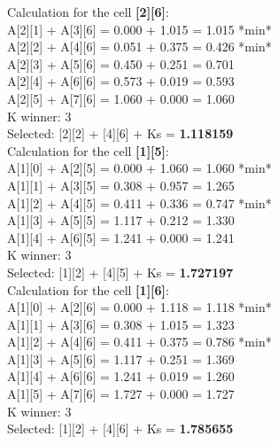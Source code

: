 \documentclass[a4paper,twocolumn,10pt]{article}
\newcommand\tab[1][1cm]{\hspace*{#1}}
\newcommand\minitab[1][0.5cm]{\hspace*{#1}}
\begin{document}
Calculation for the cell \textbf{[2][6]}: \\ 
\tab A[2][1] + A[3][6] = 0.000 + 1.015 = 1.015 *min*\\ 
\tab A[2][2] + A[4][6] = 0.051 + 0.375 = 0.426 *min*\\ 
\tab A[2][3] + A[5][6] = 0.450 + 0.251 = 0.701\\ 
\tab A[2][4] + A[6][6] = 0.573 + 0.019 = 0.593\\ 
\tab A[2][5] + A[7][6] = 1.060 + 0.000 = 1.060\\ 
\minitab K winner: 3 \\ 
\minitab Selected: [2][2] + [4][6] + Ks = \textbf{1.118159} \\ 
 
Calculation for the cell \textbf{[1][5]}: \\ 
\tab A[1][0] + A[2][5] = 0.000 + 1.060 = 1.060 *min*\\ 
\tab A[1][1] + A[3][5] = 0.308 + 0.957 = 1.265\\ 
\tab A[1][2] + A[4][5] = 0.411 + 0.336 = 0.747 *min*\\ 
\tab A[1][3] + A[5][5] = 1.117 + 0.212 = 1.330\\ 
\tab A[1][4] + A[6][5] = 1.241 + 0.000 = 1.241\\ 
\minitab K winner: 3 \\ 
\minitab Selected: [1][2] + [4][5] + Ks = \textbf{1.727197} \\ 
 
Calculation for the cell \textbf{[1][6]}: \\ 
\tab A[1][0] + A[2][6] = 0.000 + 1.118 = 1.118 *min*\\ 
\tab A[1][1] + A[3][6] = 0.308 + 1.015 = 1.323\\ 
\tab A[1][2] + A[4][6] = 0.411 + 0.375 = 0.786 *min*\\ 
\tab A[1][3] + A[5][6] = 1.117 + 0.251 = 1.369\\ 
\tab A[1][4] + A[6][6] = 1.241 + 0.019 = 1.260\\ 
\tab A[1][5] + A[7][6] = 1.727 + 0.000 = 1.727\\ 
\minitab K winner: 3 \\ 
\minitab Selected: [1][2] + [4][6] + Ks = \textbf{1.785655} \\ 
\end{document}
